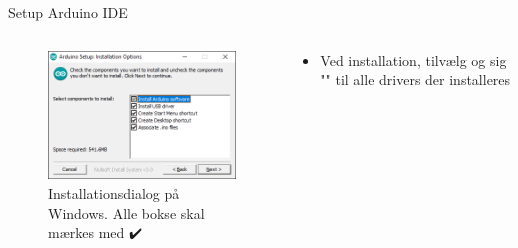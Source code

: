 \documentclass[aspectratio=169]{beamer}
\begin{document}
\begin{frame}{Setup Arduino IDE}
\begin{columns}
	\begin{column}{0.5\textwidth}
		\begin{figure}
  			\includegraphics[height=0.6\textheight,keepaspectratio=true]{assets/pictures/install-all.png}
  			\caption{Installationsdialog på Windows. Alle bokse skal mærkes med ✔️}
  			\label{fig:install-all}
		\end{figure}
	\end{column}
	\begin{column}{0.5\textwidth}
		\begin{textBox}
			\begin{itemize}
				\item Ved installation, tilvælg og sig "" til alle drivers der installeres
			\end{itemize}
		\end{textBox}
	\end{column}
\end{columns}
\end{frame}
\end{document}
